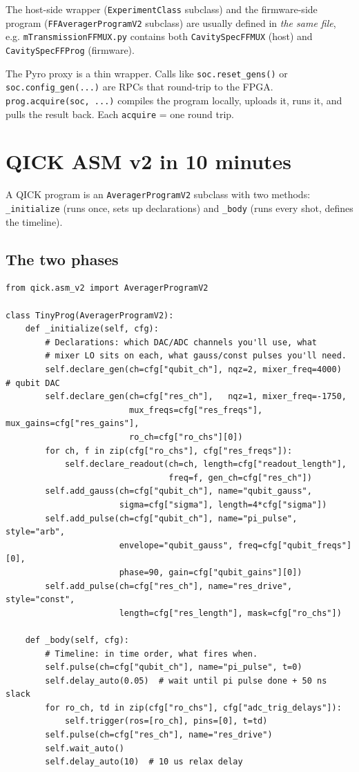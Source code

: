 \documentclass[11pt,letterpaper]{article}
\begin{document}
The host-side wrapper (\texttt{ExperimentClass} subclass) and the firmware-side program (\texttt{FFAveragerProgramV2} subclass) are usually defined in \emph{the same file}, e.g. \texttt{mTransmissionFFMUX.py} contains both \texttt{CavitySpecFFMUX} (host) and \texttt{CavitySpecFFProg} (firmware).

\begin{notebox}
The Pyro proxy is a thin wrapper. Calls like \texttt{soc.reset\_gens()} or \texttt{soc.config\_gen(...)} are RPCs that round-trip to the FPGA. \texttt{prog.acquire(soc, ...)} compiles the program locally, uploads it, runs it, and pulls the result back. Each \texttt{acquire} = one round trip.
\end{notebox}

\section{QICK ASM v2 in 10 minutes}
A QICK program is an \texttt{AveragerProgramV2} subclass with two methods: \texttt{\_initialize} (runs once, sets up declarations) and \texttt{\_body} (runs every shot, defines the timeline).

\subsection{The two phases}
\begin{lstlisting}
from qick.asm_v2 import AveragerProgramV2

class TinyProg(AveragerProgramV2):
    def _initialize(self, cfg):
        # Declarations: which DAC/ADC channels you'll use, what
        # mixer LO sits on each, what gauss/const pulses you'll need.
        self.declare_gen(ch=cfg["qubit_ch"], nqz=2, mixer_freq=4000)  # qubit DAC
        self.declare_gen(ch=cfg["res_ch"],   nqz=1, mixer_freq=-1750,
                         mux_freqs=cfg["res_freqs"], mux_gains=cfg["res_gains"],
                         ro_ch=cfg["ro_chs"][0])
        for ch, f in zip(cfg["ro_chs"], cfg["res_freqs"]):
            self.declare_readout(ch=ch, length=cfg["readout_length"],
                                 freq=f, gen_ch=cfg["res_ch"])
        self.add_gauss(ch=cfg["qubit_ch"], name="qubit_gauss",
                       sigma=cfg["sigma"], length=4*cfg["sigma"])
        self.add_pulse(ch=cfg["qubit_ch"], name="pi_pulse", style="arb",
                       envelope="qubit_gauss", freq=cfg["qubit_freqs"][0],
                       phase=90, gain=cfg["qubit_gains"][0])
        self.add_pulse(ch=cfg["res_ch"], name="res_drive", style="const",
                       length=cfg["res_length"], mask=cfg["ro_chs"])

    def _body(self, cfg):
        # Timeline: in time order, what fires when.
        self.pulse(ch=cfg["qubit_ch"], name="pi_pulse", t=0)
        self.delay_auto(0.05)  # wait until pi pulse done + 50 ns slack
        for ro_ch, td in zip(cfg["ro_chs"], cfg["adc_trig_delays"]):
            self.trigger(ros=[ro_ch], pins=[0], t=td)
        self.pulse(ch=cfg["res_ch"], name="res_drive")
        self.wait_auto()
        self.delay_auto(10)  # 10 us relax delay
\end{lstlisting}
\end{document}
